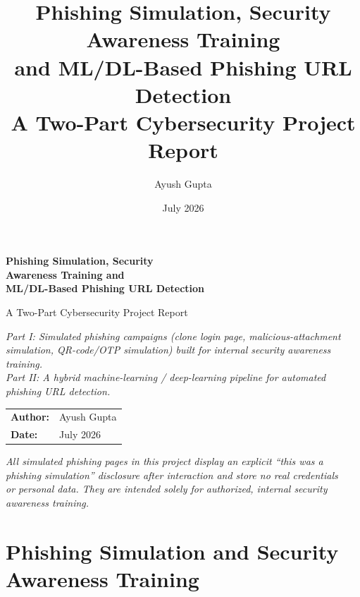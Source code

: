 \documentclass[11pt,a4paper]{report}
\title{
  \vspace{-2cm}
  {\Huge\bfseries Phishing Simulation, Security Awareness Training\\[6pt] and ML/DL-Based Phishing URL Detection}\\[1cm]
  {\large A Two-Part Cybersecurity Project Report}
}
\author{Ayush Gupta}
\date{July 2026}
\begin{document}
\begin{titlepage}
\centering
\vspace*{2cm}
{\Huge\bfseries Phishing Simulation, Security\\[4pt] Awareness Training and\\[4pt] ML/DL-Based Phishing URL Detection\par}
\vspace{1cm}
{\Large A Two-Part Cybersecurity Project Report\par}
\vspace{2cm}

{\large\itshape
Part I: Simulated phishing campaigns (clone login page, malicious-attachment\\
simulation, QR-code/OTP simulation) built for internal security awareness training.\\[8pt]
Part II: A hybrid machine-learning / deep-learning pipeline for automated\\
phishing URL detection.\par}

\vfill

\begin{center}
\begin{tabular}{ll}
\textbf{Author:} & Ayush Gupta \\
\textbf{Date:} & July 2026 \\
\end{tabular}
\end{center}

\vspace{1cm}
{\small\itshape
All simulated phishing pages in this project display an explicit ``this was a\\
phishing simulation'' disclosure after interaction and store no real credentials\\
or personal data. They are intended solely for authorized, internal security\\
awareness training.\par}

\end{titlepage}

\tableofcontents
\listoffigures
\clearpage

\part{Phishing Simulation and Security Awareness Training}
\end{document}
